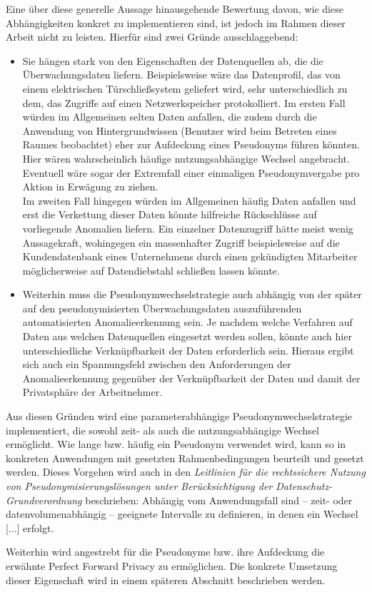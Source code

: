 Eine über diese generelle Aussage hinausgehende Bewertung davon, wie diese Abhängigkeiten konkret zu implementieren sind, ist jedoch im Rahmen dieser Arbeit nicht zu leisten. Hierfür sind zwei Gründe ausschlaggebend:
\begin{itemize}
  \item Sie hängen stark von den Eigenschaften der Datenquellen ab, die die Überwachungsdaten liefern. Beispielsweise wäre das Datenprofil, das von einem elektrischen Türschließsystem geliefert wird, sehr unterschiedlich zu dem, das Zugriffe auf einen Netzwerkspeicher protokolliert. Im ersten Fall würden im Allgemeinen selten Daten anfallen, die zudem durch die Anwendung von Hintergrundwissen (Benutzer wird beim Betreten eines Raumes beobachtet) eher zur Aufdeckung eines Pseudonyms führen könnten. Hier wären wahrscheinlich häufige nutzungsabhängige Wechsel angebracht. Eventuell wäre sogar der Extremfall einer einmaligen Pseudonymvergabe pro Aktion in Erwägung zu ziehen.\\
  Im zweiten Fall hingegen würden im Allgemeinen häufig Daten anfallen und erst die Verkettung dieser Daten könnte hilfreiche Rückschlüsse auf vorliegende Anomalien liefern. Ein einzelner Datenzugriff hätte meist wenig Aussagekraft, wohingegen ein massenhafter Zugriff beispielsweise auf die Kundendatenbank eines Unternehmens durch einen gekündigten Mitarbeiter möglicherweise auf Datendiebstahl schließen lassen könnte.
  
  \item Weiterhin muss die Pseudonymwechselstrategie auch abhängig von der später auf den pseudonymisierten Überwachungsdaten auszuführenden automatisierten Anomalieerkennung sein. Je nachdem welche Verfahren auf Daten aus welchen Datenquellen eingesetzt werden sollen, könnte auch hier unterschiedliche Verknüpfbarkeit der Daten erforderlich sein. Hieraus ergibt sich auch ein Spannungsfeld zwischen den Anforderungen der Anomalieerkennung gegenüber der Verknüpfbarkeit der Daten und damit der Privatsphäre der Arbeitnehmer.
\end{itemize}

Aus diesen Gründen wird eine parameterabhängige Pseudonymwechselstrategie implementiert, die sowohl zeit- als auch die nutzungsabhängige Wechsel ermöglicht. Wie lange bzw. häufig ein Pseudonym verwendet wird, kann so in konkreten Anwendungen mit gesetzten Rahmenbedingungen beurteilt und gesetzt werden.
Dieses Vorgehen wird auch in den \textit{Leitlinien für die rechtssichere Nutzung von Pseudonymisierungslösungen unter Berücksichtigung der Datenschutz-Grundverordnung} beschrieben: \glqq Abhängig vom Anwendungsfall sind – zeit- oder datenvolumenabhängig – geeignete Intervalle zu definieren, in denen ein Wechsel [...] erfolgt.\grqq{}\cite{schwartmann2017}

Weiterhin wird angestrebt für die Pseudonyme bzw. ihre Aufdeckung die erwähnte Perfect Forward Privacy zu ermöglichen. Die konkrete Umsetzung dieser Eigenschaft wird in einem späteren Abschnitt beschrieben werden.